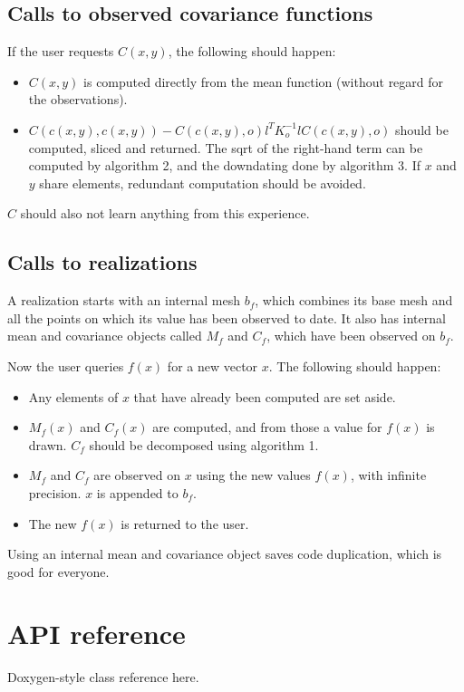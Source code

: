 \documentclass{manual}
\begin{document}
\begin{itemize}
\section{Calls to observed covariance functions}\label{sec:obsCovCalls} 
If the user requests $C(x,y)$, the following should happen:
\begin{itemize}
	\item $C(x,y)$ is computed directly from the mean function (without regard for the observations).
	\item $C(c(x,y),c(x,y)) - C(c(x,y),o) l^T K_o^{-1} l C(c(x,y),o)$ should be computed, sliced and returned. The sqrt of the right-hand term can be computed by algorithm 2, and the downdating done by algorithm 3. If $x$ and $y$ share elements, redundant computation should be avoided.
\end{itemize}
$C$ should also not learn anything from this experience.

\section{Calls to realizations}\label{sec:callsToRealizations}
A realization starts with an internal mesh $b_f$, which combines its base mesh and all the points on which its value has been observed to date. It also has internal mean and covariance objects called $M_f$ and $C_f$, which have been observed on $b_f$.

Now the user queries $f(x)$ for a new vector $x$. The following should happen:
\begin{itemize}
	\item Any elements of $x$ that have already been computed are set aside.
	\item $M_f(x)$ and $C_f(x)$ are computed, and from those a value for $f(x)$ is drawn. $C_f$ should be decomposed using algorithm 1.
	\item $M_f$ and $C_f$ are observed on $x$ using the new values $f(x)$, with infinite precision. $x$ is appended to $b_f$.
	\item The new $f(x)$ is returned to the user.
\end{itemize}
Using an internal mean and covariance object saves code duplication, which is good for everyone.
	
\end{itemize}


\chapter{API reference}\label{cha:reference} 

Doxygen-style class reference here.
\end{document}
